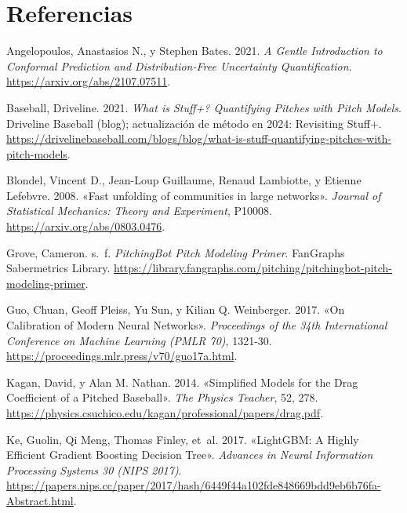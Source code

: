 \documentclass[
  english,
  spanish,
  10pt,
  letterpaper,
]{article}
\newlength{\cslhangindent}
\newenvironment{CSLReferences}[2] %
 {\begin{list}{}{%
  \setlength{\itemindent}{0pt}
  \setlength{\leftmargin}{0pt}
  \setlength{\parsep}{0pt}
  \ifodd #1
   \setlength{\leftmargin}{\cslhangindent}
   \setlength{\itemindent}{-1\cslhangindent}
  \fi
  \setlength{\itemsep}{#2\baselineskip}}}
 {\end{list}}
\begin{document}
\section*{Referencias}\label{referencias}

\protect{}\label{refs}
\begin{CSLReferences}{1}{0}
Angelopoulos, Anastasios N., y Stephen Bates. 2021. \emph{A Gentle
Introduction to Conformal Prediction and Distribution-Free Uncertainty
Quantification}. \url{https://arxiv.org/abs/2107.07511}.

Baseball, Driveline. 2021. \emph{What is Stuff+? Quantifying Pitches
with Pitch Models}. Driveline Baseball (blog); actualización de método
en 2024: Revisiting Stuff+.
\url{https://drivelinebaseball.com/blogs/blog/what-is-stuff-quantifying-pitches-with-pitch-models}.

Blondel, Vincent D., Jean-Loup Guillaume, Renaud Lambiotte, y Etienne
Lefebvre. 2008. {«Fast unfolding of communities in large networks»}.
\emph{Journal of Statistical Mechanics: Theory and Experiment}, P10008.
\url{https://arxiv.org/abs/0803.0476}.

Grove, Cameron. s.~f. \emph{PitchingBot Pitch Modeling Primer}.
FanGraphs Sabermetrics Library.
\url{https://library.fangraphs.com/pitching/pitchingbot-pitch-modeling-primer}.

Guo, Chuan, Geoff Pleiss, Yu Sun, y Kilian Q. Weinberger. 2017. {«On
Calibration of Modern Neural Networks»}. \emph{Proceedings of the 34th
International Conference on Machine Learning (PMLR 70)}, 1321-30.
\url{https://proceedings.mlr.press/v70/guo17a.html}.

Kagan, David, y Alan M. Nathan. 2014. {«Simplified Models for the Drag
Coefficient of a Pitched Baseball»}. \emph{The Physics Teacher}, 52,
278.
\url{https://physics.csuchico.edu/kagan/professional/papers/drag.pdf}.

Ke, Guolin, Qi Meng, Thomas Finley, et~al. 2017. {«LightGBM: A Highly
Efficient Gradient Boosting Decision Tree»}. \emph{Advances in Neural
Information Processing Systems 30 (NIPS 2017)}.
\url{https://papers.nips.cc/paper/2017/hash/6449f44a102fde848669bdd9eb6b76fa-Abstract.html}.


\end{CSLReferences}
\end{document}
